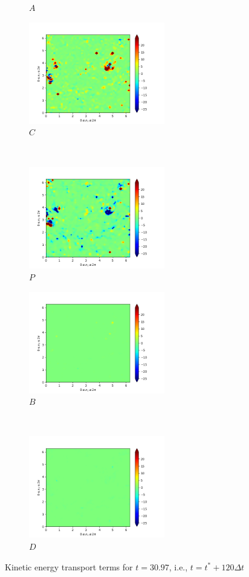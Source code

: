 \begin{figure}[H]
\begin{subfigure}{0.45\textwidth}
        \caption{$A$}
    \end{subfigure}
    \newline
    \begin{subfigure}{0.45\textwidth}
        \includegraphics[height=1.75in]{media/run-cds-65/C-ke-1460.png}
        \caption{$C$}
    \end{subfigure}
    ~
    \begin{subfigure}{0.45\textwidth}
        \includegraphics[height=1.75in]{media/run-cds-65/P-ke-1460.png}
        \caption{$P$}
    \end{subfigure}
    \newline
    \begin{subfigure}{0.45\textwidth}
        \includegraphics[height=1.75in]{media/run-cds-65/B-ke-1460.png}
        \caption{$B$}
    \end{subfigure}
    ~
    \begin{subfigure}{0.45\textwidth}
        \includegraphics[height=1.75in]{media/run-cds-65/D-ke-1460.png}
        \caption{$D$}
    \end{subfigure}
    \caption{Kinetic energy transport terms for $t=30.97$, i.e., $t=t^{\ast} + 120 \Delta t$}
\end{figure}
